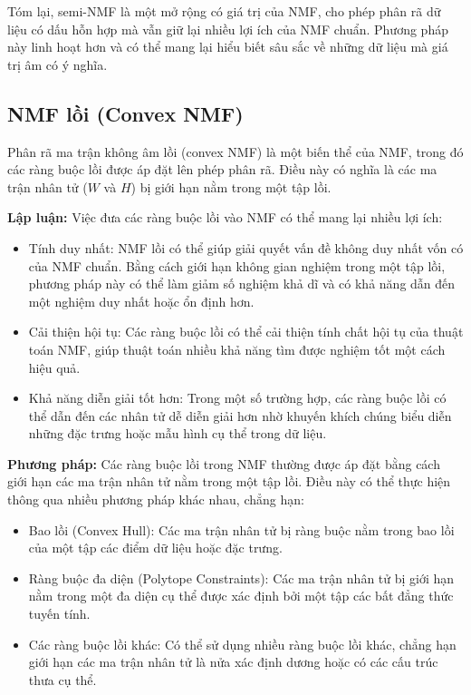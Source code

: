 Tóm lại, semi-NMF là một mở rộng có giá trị của NMF, cho phép phân rã dữ liệu có dấu hỗn hợp mà vẫn giữ lại nhiều lợi ích của NMF chuẩn. Phương pháp này linh hoạt hơn và có thể mang lại hiểu biết sâu sắc về những dữ liệu mà giá trị âm có ý nghĩa.

\subsection{NMF lồi (Convex NMF)}

Phân rã ma trận không âm lồi (convex NMF) là một biến thể của NMF, trong đó các ràng buộc lồi được áp đặt lên phép phân rã. Điều này có nghĩa là các ma trận nhân tử (\(W\) và \(H\)) bị giới hạn nằm trong một tập lồi.

\textbf{Lập luận:} Việc đưa các ràng buộc lồi vào NMF có thể mang lại nhiều lợi ích:

\begin{itemize}
\item
  Tính duy nhất: NMF lồi có thể giúp giải quyết vấn đề không duy nhất vốn có của NMF chuẩn. Bằng cách giới hạn không gian nghiệm trong một tập lồi, phương pháp này có thể làm giảm số nghiệm khả dĩ và có khả năng dẫn đến một nghiệm duy nhất hoặc ổn định hơn.
\item
  Cải thiện hội tụ: Các ràng buộc lồi có thể cải thiện tính chất hội tụ của thuật toán NMF, giúp thuật toán nhiều khả năng tìm được nghiệm tốt một cách hiệu quả.
\item
  Khả năng diễn giải tốt hơn: Trong một số trường hợp, các ràng buộc lồi có thể dẫn đến các nhân tử dễ diễn giải hơn nhờ khuyến khích chúng biểu diễn những đặc trưng hoặc mẫu hình cụ thể trong dữ liệu.
\end{itemize}

\textbf{Phương pháp:} Các ràng buộc lồi trong NMF thường được áp đặt bằng cách giới hạn các ma trận nhân tử nằm trong một tập lồi. Điều này có thể thực hiện thông qua nhiều phương pháp khác nhau, chẳng hạn:

\begin{itemize}
\item
  Bao lồi (Convex Hull): Các ma trận nhân tử bị ràng buộc nằm trong bao lồi của một tập các điểm dữ liệu hoặc đặc trưng.
\item
  Ràng buộc đa diện (Polytope Constraints): Các ma trận nhân tử bị giới hạn nằm trong một đa diện cụ thể được xác định bởi một tập các bất đẳng thức tuyến tính.
\item
  Các ràng buộc lồi khác: Có thể sử dụng nhiều ràng buộc lồi khác, chẳng hạn giới hạn các ma trận nhân tử là nửa xác định dương hoặc có các cấu trúc thưa cụ thể.
\end{itemize}

